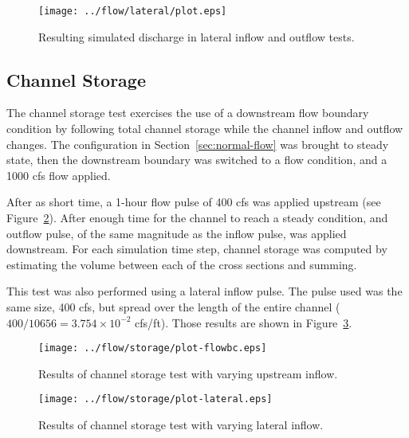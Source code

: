 \documentclass[12pt,dvips,letterpaper]{article}
\begin{document}
\begin{figure}[htbp]
  \begin{center}
    \texttt{[image: ../flow/lateral/plot.eps]}
    \caption{Resulting simulated discharge in lateral inflow and
      outflow tests.}  
    \label{fig:test-lateral}
  \end{center}
\end{figure}

\subsection{Channel Storage}
\label{sec:test-storage}

The channel storage test exercises the use of a downstream flow
boundary condition by following total channel storage while the
channel inflow and outflow changes.  The configuration in
Section~\ref{sec:normal-flow} was brought to steady state, then the
downstream boundary was switched to a flow condition, and a 1000 cfs
flow applied.  

After as short time, a 1-hour flow pulse of 400 cfs was applied
upstream (see Figure~\ref{fig:test-storage-inflow}). After enough time
for the channel to reach a steady condition, and outflow pulse, of the
same magnitude as the inflow pulse, was applied downstream.  For each
simulation time step, channel storage was computed by estimating the
volume between each of the cross sections and summing.  

This test was also performed using a lateral inflow pulse.  The pulse
used was the same size, 400 cfs, but spread over the length of the
entire channel ($400 \slash 10656 = 3.754 \times 10^{-2}$
cfs/ft). Those results are shown in
Figure~\ref{fig:test-storage-lateral}. 


\begin{figure}[htbp]
  \begin{center}
    \texttt{[image: ../flow/storage/plot-flowbc.eps]}
    \caption{Results of channel storage test with varying upstream inflow.}
    \label{fig:test-storage-inflow}
  \end{center}
\end{figure}

\begin{figure}[htbp]
  \begin{center}
    \texttt{[image: ../flow/storage/plot-lateral.eps]}
    \caption{Results of channel storage test with varying lateral inflow.}
    \label{fig:test-storage-lateral}
  \end{center}
\end{figure}
\end{document}
